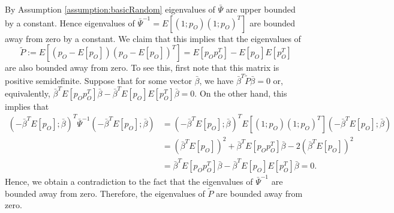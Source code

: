 \documentclass[opre,nonblindrev]{informs3} %
\begin{document}
\begin{APPENDIX}{}
By Assumption \ref{assumption:basicRandom}
eigenvalues of
$\bar \Psi$ are upper bounded by a constant. Hence
eigenvalues of
$\bar \Psi^{-1}= E[(1;p_O)(1;p_O)^T]$
are bounded away from zero by a constant.
{We claim that this implies that the eigenvalues of $$\tilde{P}:=E[(p_O-E[p_O])(p_O-E[p_O])^T]
	=E[p_O p_O^T] - E[p_O]E[p_O^T]
	$$
	are also bounded away from zero.
	To see this, first note that this matrix is positive semidefinite. Suppose that for some vector $\bar{\beta}$, we have $\bar{\beta}^T \tilde{P}\bar{\beta}=0$
	or, equivalently,
	$\bar{\beta}^T E[p_O p_O^T] \bar{\beta} - \bar{\beta}^TE[p_O]E[p_O^T] \bar{\beta}=0$.
	On the other hand,  this implies that
	\begin{equation}
	\begin{aligned}
	(
	-\bar{\beta}^T E[p_O]
	;
	\bar{\beta})^T
	\bar \Psi^{-1}
	(-\bar{\beta}^T E[p_O];
	\bar{\beta})
	&= 
	(
	-\bar{\beta}^T E[p_O]
	;
	\bar{\beta})^T
	E[(1;p_O)(1;p_O)^T]
	(-\bar{\beta}^T E[p_O];
	\bar{\beta})
	\\
	&=
	(\bar{\beta}^T E[p_O])^2 +
	\bar{\beta}^T E[p_O p_O^T] \bar{\beta}-
	2 (\bar{\beta}^T E[p_O])^2\\
	& =
	\bar{\beta}^T E[p_O p_O^T] \bar{\beta} - \bar{\beta}^TE[p_O]E[p_O^T] \bar{\beta}=0.
	\end{aligned}
	\end{equation}
	Hence, we obtain a contradiction to the fact that the eigenvalues of $\bar \Psi^{-1}$ are bounded away from zero. 
	Therefore, the eigenvalues of $\tilde{P}$ are bounded away from zero.
}


\end{APPENDIX}
\end{document}

